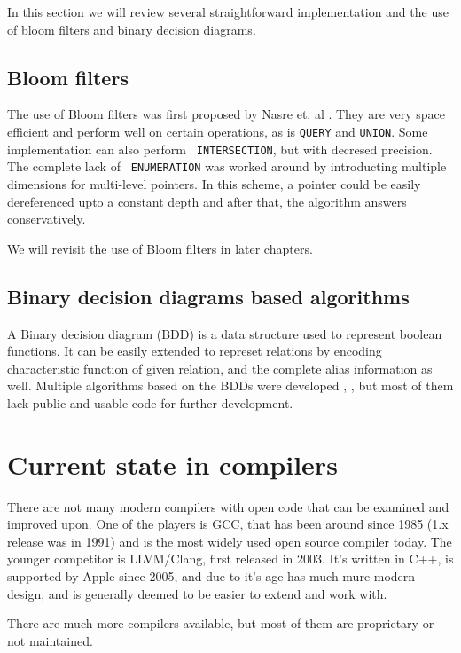 In this section we will review several straightforward implementation and the
use of bloom filters and binary decision diagrams.


\subsection{Bloom filters}

The use of Bloom filters was first proposed by Nasre et. al \cite{nasre2009}.
They are very space efficient and perform well on certain operations, as is
{\tt QUERY} and {\tt UNION}. Some implementation can also perform {\tt
INTERSECTION}, but with decresed precision. The complete lack of {\tt
ENUMERATION} was worked around by introducting multiple dimensions for
multi-level pointers. In this scheme, a pointer could be easily dereferenced
upto a constant depth and after that, the algorithm answers conservatively.

We will revisit the use of Bloom filters in later chapters.

\subsection{Binary decision diagrams based algorithms}

A Binary decision diagram (BDD) is a data structure used to represent boolean
functions. It can be easily extended to represet relations by encoding
characteristic function of given relation, and the complete alias information as
well. Multiple algorithms based on the BDDs were developed \cite{whaley2004},
\cite{bddbddb}, but most of them lack public and usable code for further
development.


\section{Current state in compilers}

There are not many modern compilers with open code that can be examined and improved
upon. One of the players is GCC, that has been around since 1985
(1.x release was in 1991) and is the most widely used open source compiler
today. The younger competitor is LLVM/Clang, first released in 2003. It's
written in C++, is supported by Apple since 2005, and due to it's age has much
mure modern design, and is generally deemed to be easier to extend and work
with.

There are much more compilers available, but most of them are proprietary or not
maintained.

